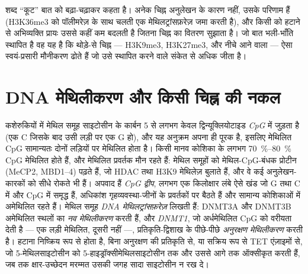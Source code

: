 \begin{remark}[कूट या सहसंबंध]\label{rem:b3:chromatin-epigenetics:code}
शब्द ``कूट'' बात को बढ़ा-चढ़ाकर कहता है। अनेक चिह्न अनुलेखन के कारण
नहीं, उसके परिणाम हैं (H3K36me3 को पॉलीमरेज़ के साथ चलती एक
मेथिलट्रांसफ़रेज़ जमा करती है), और किसी  को हटाने से अभिव्यक्ति
प्रायः उससे कहीं कम बदलती है जितना चिह्न का वितरण सुझाता है। जो बात
भली-भाँति स्थापित है वह यह है कि थोड़े-से चिह्न --- H3K9me3, H3K27me3,
और नीचे आने वाला  --- ऐसा स्वयं-प्रसारी मौनीकरण ढोते हैं
जो उसे स्थापित करने वाले संकेत से अधिक जीता है।
\end{remark}

\section{DNA मेथिलीकरण और किसी चिह्न की नकल}

\begin{definition}\label{def:b3:chromatin-epigenetics:methylation}
कशेरुकियों में मेथिल समूह साइटोसीन के कार्बन 5 से लगभग केवल
द्विन्यूक्लियोटाइड \emph{CpG} में जुड़ता है (एक C जिसके बाद उसी लड़ी पर
एक G हो), और यह अनुक्रम अपना ही पूरक है, इसलिए मेथिलित CpG सामान्यतः
दोनों लड़ियों पर मेथिलित होता है। किसी मानव कोशिका के लगभग
\qtyrange{70}{80}{\%} CpG मेथिलित होते हैं, और मेथिलित प्रवर्तक मौन
रहते हैं: मेथिल समूहों को मेथिल-CpG-बंधक प्रोटीन (MeCP2, MBD1--4)
पढ़ते हैं, जो HDAC तथा H3K9 मेथिलेज़ बुलाते हैं, और वे कई
अनुलेखन-कारकों को सीधे रोकते भी हैं। अपवाद हैं \emph{CpG द्वीप}, लगभग
एक किलोक्षार लंबे ऐसे खंड जो G तथा C में और CpG में समृद्ध हैं, अधिकांश
गृहव्यवस्था-जीनों के प्रवर्तकों पर बैठते हैं और सामान्य कोशिकाओं में
अमेथिलित रहते हैं। मेथिल समूह \emph{DNA मेथिलट्रांसफ़रेज़} लिखती हैं:
DNMT3A और DNMT3B अमेथिलित स्थलों का \emph{नव मेथिलीकरण} करती हैं, और
\emph{DNMT1}, जो अर्धमेथिलित CpG को वरीयता देती है --- एक लड़ी मेथिलित,
दूसरी नहीं ---, प्रतिकृति-द्विशाख के पीछे-पीछे \emph{अनुरक्षण
मेथिलीकरण} करती है। हटाना निष्क्रिय रूप से होता है, बिना अनुरक्षण की
प्रतिकृति से, या सक्रिय रूप से TET एंज़ाइमों से, जो
5-मेथिलसाइटोसीन को 5-हाइड्रॉक्सीमेथिलसाइटोसीन तक और उससे आगे तक
ऑक्सीकृत करती हैं, जब तक क्षार-उच्छेदन मरम्मत उसकी जगह सादा साइटोसीन
न रख दे।
\end{definition}

